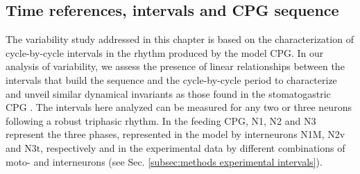 
\subsection{Time references, intervals and CPG sequence}
\label{subsec:intervals}
The variability study addressed in this chapter is based on the characterization of cycle-by-cycle intervals in the rhythm produced by the model CPG.
In our analysis of variability, we assess the presence of linear relationships between the intervals that build the sequence and the cycle-by-cycle period to characterize and unveil similar dynamical invariants as those found in the stomatogastric CPG \parencite{elices_robust_2019}. 
The intervals here analyzed can be measured for any two or three neurons following a robust triphasic rhythm. In the feeding CPG, N1, N2 and N3 represent the three phases, represented in the model by interneurons N1M, N2v and N3t, respectively and in the experimental data by different combinations of moto- and interneurons (see Sec. \ref{subsec:methods experimental intervals}).

